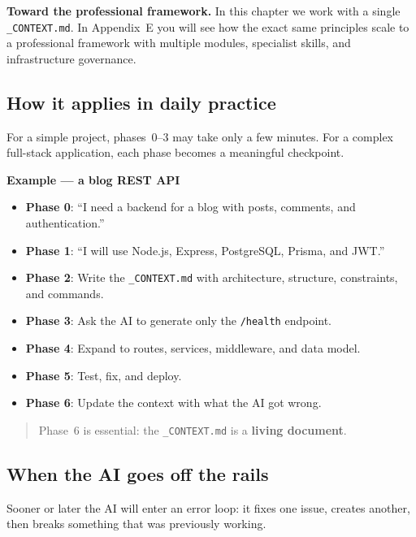 \begin{notebox}
\textbf{Toward the professional framework.} In this chapter we work with a single \texttt{\_CONTEXT.md}. In Appendix~E you will see how the exact same principles scale to a professional framework with multiple modules, specialist skills, and infrastructure governance.
\end{notebox}

\subsection{How it applies in daily practice}

For a simple project, phases~0--3 may take only a few minutes. For a complex full-stack application, each phase becomes a meaningful checkpoint.

\textbf{Example --- a blog REST API}
\begin{itemize}
  \item \textbf{Phase 0}: ``I need a backend for a blog with posts, comments, and authentication.''
  \item \textbf{Phase 1}: ``I will use Node.js, Express, PostgreSQL, Prisma, and JWT.''
  \item \textbf{Phase 2}: Write the \texttt{\_CONTEXT.md} with architecture, structure, constraints, and commands.
  \item \textbf{Phase 3}: Ask the AI to generate only the \texttt{/health} endpoint.
  \item \textbf{Phase 4}: Expand to routes, services, middleware, and data model.
  \item \textbf{Phase 5}: Test, fix, and deploy.
  \item \textbf{Phase 6}: Update the context with what the AI got wrong.
\end{itemize}

\begin{quote}
Phase~6 is essential: the \texttt{\_CONTEXT.md} is a \textbf{living document}.
\end{quote}

\subsection{When the AI goes off the rails}

Sooner or later the AI will enter an error loop: it fixes one issue, creates another, then breaks something that was previously working.

